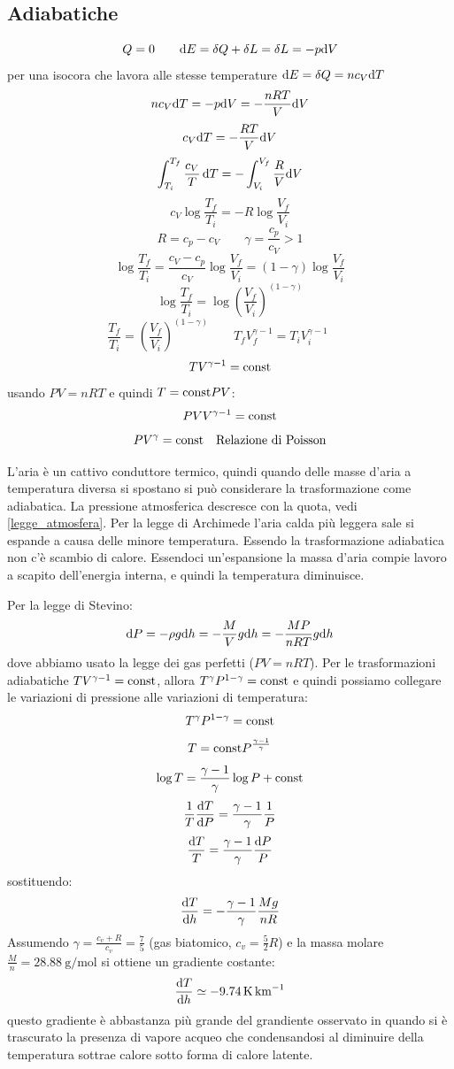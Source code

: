 \subsection{Adiabatiche}
\[Q=0\qquad \mathrm{d} E=\delta Q+\delta L=\delta L=-p\mathrm{d} V\]
per una isocora che lavora alle stesse temperature $\mathrm{d} E=\delta Q=nc_V\mathrm{d} T$
\[nc_V\mathrm{d} T=-p\mathrm{d} V=-\frac{nRT}{V}\mathrm{d} V\]
\[c_V\mathrm{d} T=-\frac{RT}{V}\mathrm{d} V\]
\[\int_{T_i}^{T_f}\frac{c_V}{T}\,\mathrm{d} T=-\int_{V_i}^{V_f}\frac{R}{V}\mathrm{d} V\]
\[c_V\log\frac{T_f}{T_i}=-R\log\frac{V_f}{V_i}\]
\[R=c_p-c_V\qquad \gamma=\frac{c_p}{c_V}>1\]
\[\log\frac{T_f}{T_i}=\frac{c_V-c_p}{c_V}\log\frac{V_f}{V_i}=(1-\gamma)\log\frac{V_f}{V_i}\]
\[\log\frac{T_f}{T_i}=\log\left(\frac{V_f}{V_i}\right)^{\left(1-\gamma\right)}\]
\[\frac{T_f}{T_i}=\left(\frac{V_f}{V_i}\right)^{\left(1-\gamma\right)}\qquad T_fV_f^{\gamma-1}=T_iV_i^{\gamma-1}\qquad\]
\[TV^{\gamma-1}=\text{const}\]
usando $PV=nRT$ e quindi $T=\text{const} PV$:
\[PVV^{\gamma-1}=\text{const}\]
\begin{equation}
   PV^\gamma=\text{const}\quad\text{Relazione di Poisson}
\end{equation}

\begin{Es}
   L'aria è un cattivo conduttore termico, quindi quando delle masse d'aria a temperatura diversa si spostano si può considerare la trasformazione come adiabatica. La pressione atmosferica descresce con la quota, vedi \eqref{legge_atmosfera}. Per la legge di Archimede l'aria calda più leggera sale si espande a causa delle minore temperatura. Essendo la trasformazione adiabatica non c'è scambio di calore. Essendoci un'espansione la massa d'aria compie lavoro a scapito dell'energia interna, e quindi la temperatura diminuisce.

   Per la legge di Stevino:
   \[
      \mathrm{d} P = -\rho g \mathrm{d} h = -\frac{M}{V} g \mathrm{d} h = -\frac{MP}{nRT} g \mathrm{d} h
   \]
   dove abbiamo usato la legge dei gas perfetti ($PV=nRT$). Per le trasformazioni adiabatiche $TV^{\gamma-1}=\text{const}$, allora $T^\gamma P^{1-\gamma} = \text{const}$ e quindi possiamo collegare le variazioni di pressione alle variazioni di temperatura:
   \[ T^{\gamma} P^{1-\gamma} = \text{const}\]
   \[ T = \text{const} P^{\frac{\gamma - 1}{\gamma}}\]
   \[ \log T = \frac{\gamma - 1}{\gamma} \log P + \text{const}\]
   \[\frac{1}{T}\frac{\mathrm{d} T}{\mathrm{d} P} = \frac{\gamma - 1}{\gamma} \frac{1}{P} \]
   \[\frac{\mathrm{d} T}{T} = \frac{\gamma - 1}{\gamma} \frac{\mathrm{d} P}{P} \]
   sostituendo:
   \[
      \frac{\mathrm{d} T}{\mathrm{d} h} = -\frac{\gamma -1}{\gamma} \frac{Mg}{nR}
   \]
   Assumendo $\gamma = \frac{c_v+R}{c_v} = \frac{7}{5}$ (gas biatomico, $c_v = \frac{5}{2}R$) e la massa molare $\frac{M}{n} = \SI{28.88}{\gram\per\mol}$ si ottiene un gradiente costante:
   \[
      \frac{\mathrm{d} T}{\mathrm{d} h} \simeq -\SI{9.74}{\kelvin\per\kilo\meter}
   \]
   questo gradiente è abbastanza più grande del grandiente osservato in quando si è trascurato la presenza di vapore acqueo che condensandosi al diminuire della temperatura sottrae calore sotto forma di calore latente.
\end{Es}


